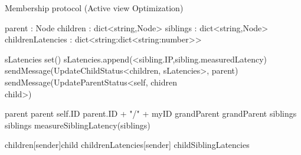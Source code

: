 \begin{algorithm}
    \caption{Membership protocol (Active view Optimization)} \label{alg:memb:active_view_maint}
    \begin{algorithmic}[1]
        \asdstate
            \State parent : Node  \label{alg:memb:active_view_maint:state_start}
            \State children : dict<string,Node>  
            \State siblings : dict<string,Node> 
            \State childrenLatencies : dict<string:dict<string:number>> \label{alg:memb:active_view_maint:state_end} 
        \asdend

         \label{alg:memb:active_view_maint:update}
                \State sLatencies \asdassign set()
                    \State sLatencies.append(<sibling.IP,sibling.measuredLatency)
                \EndFor
                \State sendMessage(UpdateChildStatus<children, sLatencies>, parent)
            \EndIf
                \State sendMessage(UpdateParentStatus<self, chidren \\ child>)
            \EndFor
        \asdend \label{alg:memb:active_view_maint:update_end}

        \label{alg:memb:active_view_maint:update_recv_par}
                \State parent \asdassign parent
                \State self.ID \asdassign parent.ID + "/" + myID
                \State grandParent \asdassign grandParent
                \State siblings \asdassign siblings
                \State measureSiblingLatency(siblings)
            \EndIf
        \asdend

        \label{alg:memb:active_view_maint:update_recv_chi}
                \State children[sender]\asdassign child
                \State childrenLatencies[sender] \asdassign childSiblingLatencies
            \EndIf
        \asdend
    
    

\end{algorithmic}
\end{algorithm}
